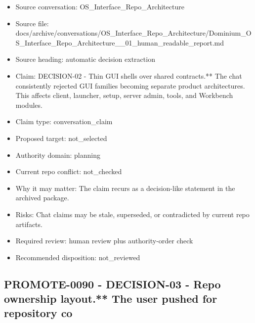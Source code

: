 \documentclass[11pt,a4paper]{report}
\begin{document}
\begin{itemize}
\item Source conversation: OS\_Interface\_Repo\_Architecture
\item Source file: docs/archive/conversations/OS\_Interface\_Repo\_Architecture/Dominium\_OS\_Interface\_Repo\_Architecture\_\_01\_human\_readable\_report.md
\item Source heading: automatic decision extraction
\item Claim: DECISION-02 - Thin GUI shells over shared contracts.** The chat consistently rejected GUI families becoming separate product architectures. This affects client, launcher, setup, server admin, tools, and Workbench modules.
\item Claim type: conversation\_claim
\item Proposed target: not\_selected
\item Authority domain: planning
\item Current repo conflict: not\_checked
\item Why it may matter: The claim recurs as a decision-like statement in the archived package.
\item Risks: Chat claims may be stale, superseded, or contradicted by current repo artifacts.
\item Required review: human review plus authority-order check
\item Recommended disposition: not\_reviewed
\end{itemize}

\subsection{PROMOTE-0090 - DECISION-03 - Repo ownership layout.** The user pushed for repository co}
\end{document}
